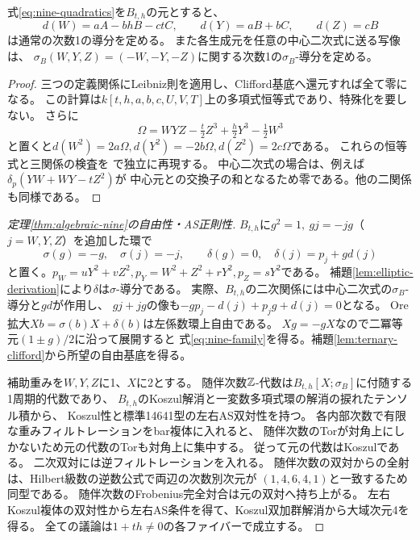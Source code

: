 \begin{lemma}[導分の三つの独立な係数]\label{lem:elliptic-derivation}
式\eqref{eq:nine-quadratics}を$B_{t,h}$の元とすると、
\begin{equation}\label{eq:elliptic-derivation}
 d(W)=aA-bhB-ctC,\qquad d(Y)=aB+bC,\qquad d(Z)=cB
\end{equation}
は通常の次数1の導分を定める。
また各生成元を任意の中心二次式に送る写像は、
$\sigma_B(W,Y,Z)=(-W,-Y,-Z)$に関する次数1の$\sigma_B$-導分を定める。
\end{lemma}
\begin{proof}
三つの定義関係にLeibniz則を適用し、Clifford基底へ還元すれば全て零になる。
この計算は$k[t,h,a,b,c,U,V,T]$上の多項式恒等式であり、特殊化を要しない。
さらに
\[
 \Omega=WYZ-\tfrac t2Z^3+\tfrac h2Y^3-\tfrac12W^3
\]
と置くと$d(W^2)=2a\Omega,d(Y^2)=-2b\Omega,d(Z^2)=2c\Omega$である。
これらの恒等式と三関係の検査を
で独立に再現する。
中心二次式の場合は、例えば$\delta_p(YW+WY-tZ^2)$が
中心元との交換子の和となるため零である。他の二関係も同様である。
\end{proof}

\begin{proof}[定理\ref{thm:algebraic-nine}の自由性・AS正則性]
$B_{t,h}$に$g^2=1,\ gj=-jg$（$j=W,Y,Z$）を追加した環で
\[
 \sigma(g)=-g,\quad \sigma(j)=-j,\qquad
 \delta(g)=0,\quad \delta(j)=p_j+g d(j)
\]
と置く。$p_W=uY^2+vZ^2,p_Y=W^2+Z^2+rY^2,p_Z=sY^2$である。
補題\ref{lem:elliptic-derivation}により$\delta$は$\sigma$-導分である。
実際、$B_{t,h}$の二次関係には中心二次式の$\sigma_B$-導分と$g d$が作用し、
$gj+jg$の像も$-gp_j-d(j)+p_jg+d(j)=0$となる。
Ore拡大$Xb=\sigma(b)X+\delta(b)$は左係数環上自由である。
$Xg=-gX$なので二冪等元$(1\pm g)/2$に沿って展開すると
式\eqref{eq:nine-family}を得る。補題\ref{lem:ternary-clifford}から所望の自由基底を得る。

補助重みを$W,Y,Z$に1、$X$に2とする。
随伴次数$\mathbb Z$-代数は$B_{t,h}[X;\sigma_B]$に付随する1周期的代数であり、
$B_{t,h}$のKoszul解消と一変数多項式環の解消の捩れたテンソル積から、
Koszul性と標準14641型の左右AS双対性を持つ。
各内部次数で有限な重みフィルトレーションをbar複体に入れると、
随伴次数のTorが対角上にしかないため元の代数のTorも対角上に集中する。
従って元の代数はKoszulである。
二次双対には逆フィルトレーションを入れる。
随伴次数の双対からの全射は、Hilbert級数の逆数公式で両辺の次数別次元が
$(1,4,6,4,1)$と一致するため同型である。
随伴次数のFrobenius完全対合は元の双対へ持ち上がる。
左右Koszul複体の双対性から左右AS条件を得て、Koszul双加群解消から大域次元4を得る。
全ての議論は$1+th\ne0$の各ファイバーで成立する。
\end{proof}

